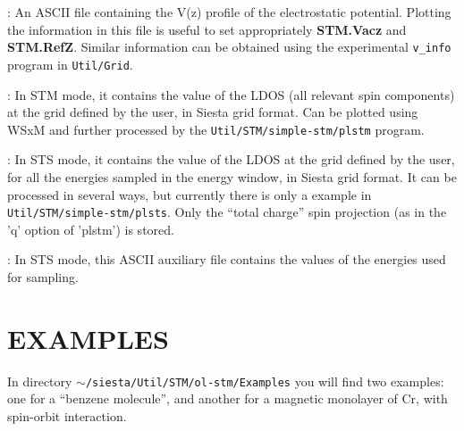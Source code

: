 \begin{description}
\itemsep 10pt
\parsep 0pt

\item[{\bf {\it SystemLabel}.v\_ave\_z}]: An ASCII file containing the
  V(z) profile of the electrostatic potential. Plotting the
  information in this file is useful to set appropriately {\bf
    STM.Vacz} and {\bf STM.RefZ}.  Similar information can be obtained
  using the experimental {\tt v\_info} program in {\tt Util/Grid}.
  
\item[{\bf {\it SystemLabel}.STM.LDOS}]: In STM mode, it contains the
  value of the LDOS (all relevant spin components) at the grid defined
  by the user, in {\sc Siesta} grid format. Can be plotted using WSxM
  and further processed by the {\tt Util/STM/simple-stm/plstm}
  program.

\item[{\bf {\it SystemLabel}.STS}]: In STS mode, it contains the value
  of the LDOS at the grid defined by the user, for all the energies
  sampled in the energy window, in {\sc Siesta} grid format. It can be
  processed in several ways, but currently there is only a example in
  {\tt Util/STM/simple-stm/plsts}. Only the ``total charge'' spin
  projection (as in the 'q' option of 'plstm') is stored.

\item[{\bf {\it SystemLabel}.STS\_AUX}]: In STS mode, this ASCII auxiliary
  file contains the values of the energies used for sampling.

\end{description}



\section{EXAMPLES}

In directory {\tt $\sim$/siesta/Util/STM/ol-stm/Examples} you will
find two examples: one for a ``benzene molecule'', and another for
a magnetic monolayer of Cr, with spin-orbit interaction.


